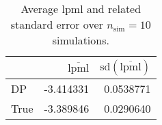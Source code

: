 \begin{table}[H]

\caption{Average lpml and related standard error over $n_{\text{sim}} = 10$ simulations.}
\centering
\begin{tabular}[t]{lrr}
\toprule
  & $\overbar{\text{lpml}}$ & $\text{sd}(\overbar{\text{lpml}})$\\
\midrule
DP & -3.414331 & 0.0538771\\
True & -3.389846 & 0.0290640\\
\bottomrule
\end{tabular}
\end{table}